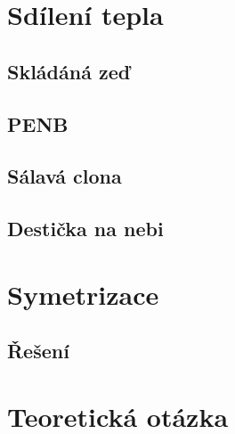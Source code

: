 \documentclass{article}
\begin{document}
\maketitle
\tableofcontents
\newpage




\section{Sdílení tepla}

\subsection{Skládáná zeď}

\subsection{PENB}

\subsection{Sálavá clona}

\subsection{Destička na nebi}

\newpage



\section{Symetrizace}




\subsection{Řešení}


\newpage



\section{Teoretická otázka}
\end{document}
